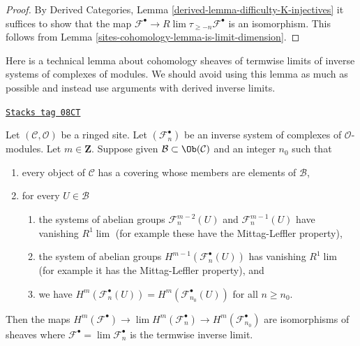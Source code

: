 \begin{proof}
By Derived Categories, Lemma \ref{derived-lemma-difficulty-K-injectives}
it suffices to show that the map
$\mathcal{F}^\bullet \to R\lim \tau_{\geq -n} \mathcal{F}^\bullet$
is an isomorphism. This follows from Lemma \ref{sites-cohomology-lemma-is-limit-dimension}.
\end{proof}

Here is a technical lemma about cohomology sheaves of termwise limits of
inverse systems of complexes of modules. We should avoid using this lemma
as much as possible and instead use arguments with derived inverse
limits.

\begin{lemma}
\label{sites-cohomology-lemma-inverse-limit-complexes}
\href{https://stacks.math.columbia.edu/tag/08CT}{\texttt{Stacks tag 08CT}}

Let $(\mathcal{C}, \mathcal{O})$ be a ringed site. Let
$(\mathcal{F}_n^\bullet)$ be an inverse system of complexes of
$\mathcal{O}$-modules. Let $m \in \mathbf{Z}$. Suppose given
$\mathcal{B} \subset \Ob(\mathcal{C})$ and an integer
$n_0$ such that
\begin{enumerate}
\item every object of $\mathcal{C}$ has a covering whose members are
elements of $\mathcal{B}$,
\item for every $U \in \mathcal{B}$
\begin{enumerate}
\item the systems of abelian groups
$\mathcal{F}_n^{m - 2}(U)$ and $\mathcal{F}_n^{m - 1}(U)$
have vanishing $R^1\lim$ (for example these have the Mittag-Leffler property),
\item the system of abelian groups $H^{m - 1}(\mathcal{F}_n^\bullet(U))$
has vanishing $R^1\lim$ (for example it has the Mittag-Leffler property), and
\item we have
$H^m(\mathcal{F}_n^\bullet(U)) = H^m(\mathcal{F}_{n_0}^\bullet(U))$
for all $n \geq n_0$.
\end{enumerate}
\end{enumerate}
Then the maps $H^m(\mathcal{F}^\bullet) \to \lim H^m(\mathcal{F}_n^\bullet)
\to H^m(\mathcal{F}_{n_0}^\bullet)$ are isomorphisms of sheaves where
$\mathcal{F}^\bullet = \lim \mathcal{F}_n^\bullet$ is the termwise
inverse limit.
\end{lemma}

